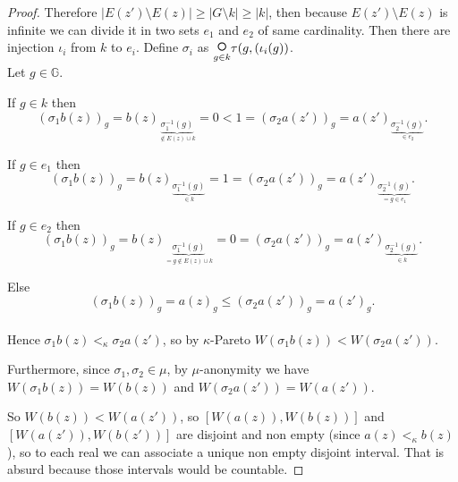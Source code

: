 \documentclass{article}
\begin{document}
\begin{proof}
  Therefore $|E(z')\setminus E(z)|\geq|G\setminus k|\geq |k|$, then because $E(z')\setminus E(z)$ is infinite we can divide it in two sets $e_1$ and $e_2$ of same cardinality. Then there are injection $\iota_i$ from $k$ to $e_i$. Define $\sigma_i$ as $\underset{g\in k}{\text{\LARGE $\circ$}}\tau(g,(\iota_i(g))$. \\

  Let $g\in\mathbb G$.

  If $g\in k$ then
  \[(\sigma_1 b(z))_g=b(z)_{\underset{\notin E(z)\cup k}{\underbrace{\sigma_1^{-1}(g)}}}=0<1=(\sigma_2 a(z'))_g=a(z')_{\underset{\in e_2}{\underbrace{\sigma_2^{-1}(g)}}}.\]

  If $g\in e_1$ then
  \[(\sigma_1 b(z))_g=b(z)_{\underset{\in k}{\underbrace{\sigma_1^{-1}(g)}}}=1=(\sigma_2 a(z'))_g=a(z')_{\underset{=g\in e_1}{\underbrace{\sigma_2^{-1}(g)}}}.\]

  If $g\in e_2$ then
  \[(\sigma_1 b(z))_g=b(z)_{\underset{=g \notin E(z)\cup k}{\underbrace{\sigma_1^{-1}(g)}}}=0=(\sigma_2 a(z'))_g=a(z')_{\underset{\in k}{\underbrace{\sigma_2^{-1}(g)}}}.\]

  Else
  \[(\sigma_1 b(z))_g=a(z)_g\leq (\sigma_2 a(z'))_g=a(z')_g.\] \\

  Hence $\sigma_1b(z)<_\kappa \sigma_2a(z')$, so by $\kappa$-Pareto $W(\sigma_1b(z))<W(\sigma_2a(z'))$.

  Furthermore, since $\sigma_1,\sigma_2\in\mu$, by $\mu$-anonymity we have $W(\sigma_1b(z))=W(b(z))$ and $W(\sigma_2a(z'))=W(a(z'))$.

  So $W(b(z))<W(a(z'))$, so $[W(a(z)),W(b(z))]$ and $[W(a(z')),W(b(z'))]$ are disjoint and non empty (since $a(z)<_\kappa b(z)$), so to each real we can associate a unique non empty disjoint interval. That is absurd because those intervals would be countable.

\end{proof}





\end{document}

